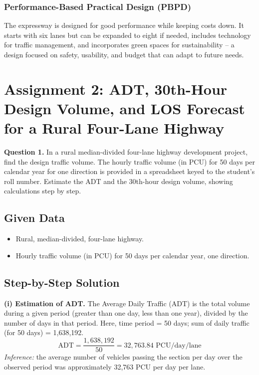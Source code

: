 \documentclass[11pt]{article}
\begin{document}
\subsubsection{Performance-Based Practical Design (PBPD)}
The expressway is designed for good performance while keeping costs down. It starts with six lanes but
can be expanded to eight if needed, includes technology for traffic management, and incorporates green
spaces for sustainability -- a design focused on safety, usability, and budget that can adapt to future
needs.

\clearpage
\section{Assignment 2: ADT, 30th-Hour Design Volume, and LOS Forecast for a Rural Four-Lane Highway}

\textbf{Question 1.} In a rural median-divided four-lane highway development project, find the design
traffic volume. The hourly traffic volume (in PCU) for 50 days per calendar year for one direction is
provided in a spreadsheet keyed to the student's roll number. Estimate the ADT and the 30th-hour design
volume, showing calculations step by step.

\subsection{Given Data}
\begin{itemize}
  \item Rural, median-divided, four-lane highway.
  \item Hourly traffic volume (in PCU) for 50 days per calendar year, one direction.
\end{itemize}

\subsection{Step-by-Step Solution}

\textbf{(i) Estimation of ADT.} The Average Daily Traffic (ADT) is the total volume during a given
period (greater than one day, less than one year), divided by the number of days in that period. Here,
time period = 50 days; sum of daily traffic (for 50 days) = 1{,}638{,}192.
\[
\text{ADT} = \frac{1{,}638{,}192}{50} = 32{,}763.84 \text{ PCU/day/lane}
\]
\textit{Inference:} the average number of vehicles passing the section per day over the observed period
was approximately 32{,}763 PCU per day per lane.
\end{document}
